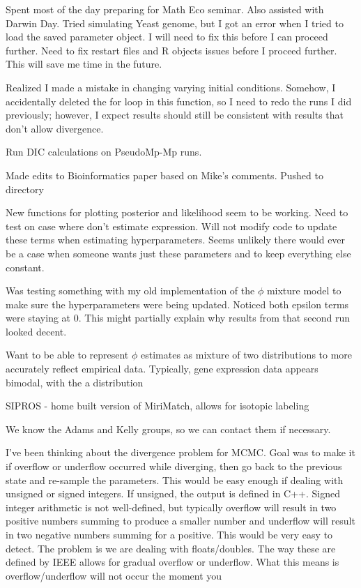 \documentclass[11pt]{labbook}
\begin{document}
Spent most of the day preparing for Math Eco seminar. Also assisted with Darwin Day. Tried simulating Yeast genome, but I got an error when I tried to load the saved parameter object. I will need to fix this before I can proceed further. Need to fix restart files and R objects issues before I proceed further. This will save me time in the future.  
 
Realized I made a mistake in changing varying initial conditions. Somehow, I accidentally deleted the for loop in this function, so I need to redo the runs I did previously; however, I expect results should still be consistent with results that don't allow divergence. 

Run DIC calculations on PseudoMp-Mp runs. 


Made edits to Bioinformatics paper based on Mike's comments. Pushed to directory

New functions for plotting posterior and likelihood seem to be working. Need to test on case where don't estimate expression. Will not modify code to update these terms when estimating hyperparameters. Seems unlikely there would ever be a case when someone wants just these parameters and to keep everything else constant. 

Was testing something with my old implementation of the $\phi$ mixture model to make sure the hyperparameters were being updated. Noticed both epsilon terms were staying at 0. This might partially explain why results from that second run looked decent.




Want to be able to represent $\phi$ estimates as mixture of two distributions to more accurately reflect empirical data. Typically, gene expression data appears bimodal, with the a distribution 



SIPROS - home built version of MiriMatch, allows for isotopic labeling 

We know the Adams and Kelly groups, so we can contact them if necessary. 



I've been thinking about the divergence problem for MCMC. Goal was to make it if overflow or underflow occurred while diverging, then go back to the previous state and re-sample the parameters. This would be easy enough if dealing with unsigned or signed integers. If unsigned, the output is defined in C++. Signed integer arithmetic is not well-defined, but typically overflow will result in two positive numbers summing to produce a smaller number and underflow will result in two negative numbers summing for a positive. This would be very easy to detect. The problem is we are dealing with floats/doubles. The way these are defined by IEEE allows for gradual overflow or underflow. What this means is overflow/underflow will not occur the moment you 
\end{document}
